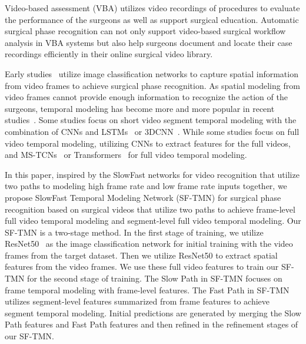 \documentclass[sn-mathphys,Numbered]{sn-jnl}
\theoremstyle{thmstyleone}\newtheorem{theorem}{Theorem}\newtheorem{proposition}[theorem]{Proposition}
\theoremstyle{thmstyletwo}\newtheorem{example}{Example}\newtheorem{remark}{Remark}
\theoremstyle{thmstylethree}\newtheorem{definition}{Definition}
\begin{document}
Video-based assessment (VBA) utilizes video recordings of procedures to evaluate the performance of the surgeons as well as support surgical education\cite{feldman2020sages}. Automatic surgical phase recognition can not only support video-based surgical workflow analysis in VBA systems but also help surgeons document and locate their case recordings efficiently in their online surgical video library.


Early studies~\cite{twinanda2016endonet,zia2018surgical} utilize image classification networks to capture spatial information from video frames to achieve surgical phase recognition. As spatial modeling from video frames cannot provide enough information to recognize the action of the surgeons, temporal modeling has become more and more popular in recent studies~\cite{jin2021temporal,jin2022trans,zhang2022towards,kirtac2022surgical,demir2022deep,valderrama2022towards,goldbraikh2023bounded,konduri2023surgical,zang2023surgical,tao2023last,liu2023lovit}. Some studies focus on short video segment temporal modeling with the combination of CNNs and LSTMs~\cite{jin2017sv,jin2020multi} or 3DCNN~\cite{zhang2021surgical}. While some studies focus on full video temporal modeling, utilizing CNNs to extract features for the full videos, and MS-TCNs~\cite{czempiel2020tecno,fer2023artificial,zhang2021swnet} or Transformers~\cite{czempiel2021opera,zhang2022surgicala,zhang2022surgicalb} for full video temporal modeling.

In this paper, inspired by the SlowFast networks for video recognition \cite{feichtenhofer2019slowfast} that utilize two paths to modeling high frame rate and low frame rate inputs together, we propose SlowFast Temporal Modeling Network (SF-TMN) for surgical phase recognition based on surgical videos that utilize two paths to achieve frame-level full video temporal modeling and segment-level full video temporal modeling. Our SF-TMN is a two-stage method. In the first stage of training, we utilize ResNet50~\cite{he2016deep} as the image classification network for initial training with the video frames from the target dataset. Then we utilize ResNet50 to extract spatial features from the video frames. We use these full video features to train our SF-TMN for the second stage of training. The Slow Path in SF-TMN focuses on frame temporal modeling with frame-level features. The Fast Path in SF-TMN utilizes segment-level features summarized from frame features to achieve segment temporal modeling. Initial predictions are generated by merging the Slow Path features and Fast Path features and then refined in the refinement stages of our SF-TMN. 
\end{document}
